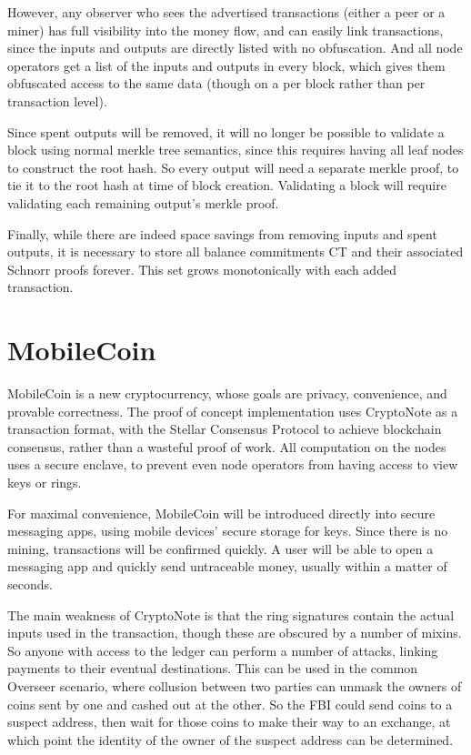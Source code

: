 \documentclass{article}
\begin{document}
However, any observer who sees the advertised transactions (either a peer or a miner) has full visibility into the money flow, and can easily link transactions, since the inputs and outputs are directly listed with no obfuscation.  And all node operators get a list of the inputs and outputs in every block, which gives them obfuscated access to the same data (though on a per block rather than per transaction level).

Since spent outputs will be removed, it will no longer be possible to validate a block using normal merkle tree semantics, since this requires having all leaf nodes to construct the root hash.  So every output will need a separate merkle proof, to tie it to the root hash at time of block creation.  Validating a block will require validating each remaining output's merkle proof.

Finally, while there are indeed space savings from removing inputs and spent outputs, it is necessary to store all balance commitments CT and their associated Schnorr proofs forever.  This set grows monotonically with each added transaction.  



\section{MobileCoin}

MobileCoin is a new cryptocurrency, whose goals are privacy, convenience, and provable correctness.  The proof of concept implementation uses CryptoNote as a transaction format, with the Stellar Consensus Protocol to achieve blockchain consensus, rather than a wasteful proof of work.  All computation on the nodes uses a secure enclave, to prevent even node operators from having access to view keys or rings.  

For maximal convenience, MobileCoin will be introduced directly into secure messaging apps, using mobile devices' secure storage for keys.  Since there is no mining, transactions will be confirmed quickly.  A user will be able to open a messaging app and quickly send untraceable money, usually within a matter of seconds.

The main weakness of CryptoNote is that the ring signatures contain the actual inputs used in the transaction, though these are obscured by a number of mixins.  So anyone with access to the ledger can perform a number of attacks, linking payments to their eventual destinations.  This can be used in the common Overseer scenario, where collusion between two parties can unmask the owners of coins sent by one and cashed out at the other.  So the FBI could send coins to a suspect address, then wait for those coins to make their way to an exchange, at which point the identity of the owner of the suspect address can be determined.
\end{document}
